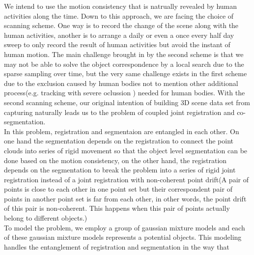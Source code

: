 We intend to use the motion consistency that is natrually revealed by human activities along the time. Down to this approach, we are facing the choice of scanning scheme. One way is to record the change of the scene along with the human activities, another is to arrange a daily or even a once every half day sweep to only record the result of human activities but avoid the instant of human motion. The main challenge brought in by the second scheme is that we may not be able to solve the object correspondence by a local search due to the sparse sampling over time, but the very same challenge exists in the first scheme due to the exclusion caused by human bodies not to mention other additional process(e.g. tracking with severe oclussion ) needed for human bodies. With the second scanning scheme, our original intention of building 3D scene data set from capturing naturally leads us to the problem of coupled joint registration and co-segmentation.\\ In this problem, registration and segmentaion are entangled in each other. On one hand the segmentation depends on the registration to connect the point clouds into series of rigid movement so that the object level segmentation can be done based on the motion consistency, on the other hand, the registration depends on the segmentation to break the problem into a series of rigid joint registration instead of a joint registration with non-coherent point drift(A pair of points is close to each other in one point set but their correspondent pair of points in another point set is far from each other, in other words, the point drift of this pair is non-coherent. This happens when this pair of points actually belong to different objects.)\\
To model the problem, we employ a group of gaussian mixture models and each of these gaussian mixture models represents a potential objects. This modeling handles the entanglement of registration and segmentation in the way that      
      